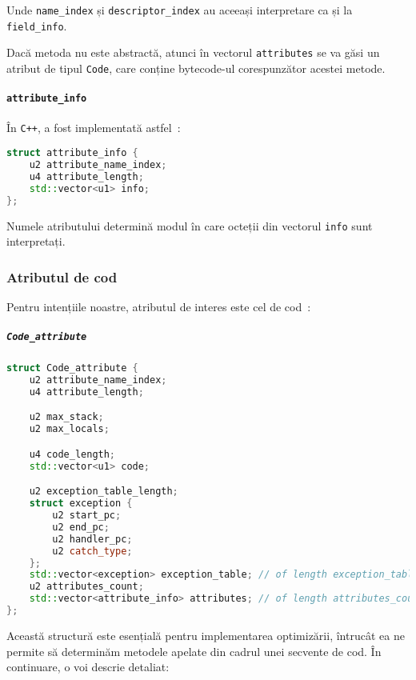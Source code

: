 Unde \texttt{name\_index} și \texttt{descriptor\_index} au aceeași
interpretare ca și la \texttt{field\_info}.

Dacă metoda nu este abstractă, atunci în vectorul \texttt{attributes} se
va găsi un atribut de tipul \texttt{Code}, care conține bytecode-ul
corespunzător acestei metode.

\paragraph{\texorpdfstring{\texttt{attribute\_info}}{attribute\_info}}\label{attribute_info}

În \texttt{C++}, a fost implementată astfel~\cite{classfile_sections}:

\begin{lstlisting}[language=C++]
struct attribute_info {
    u2 attribute_name_index;
    u4 attribute_length;
    std::vector<u1> info;
};
\end{lstlisting}

Numele atributului determină modul în care octeții din vectorul
\texttt{info} sunt interpretați.

\subsubsection{Atributul de cod}

Pentru intențiile noastre, atributul de interes este cel de cod~\cite{classfile_sections}:

\subparagraph{\texorpdfstring{\texttt{Code\_attribute}}{Code\_attribute}}\label{code_attribute}

\begin{lstlisting}[language=C++]
struct Code_attribute {
    u2 attribute_name_index;
    u4 attribute_length;

    u2 max_stack;
    u2 max_locals;

    u4 code_length;
    std::vector<u1> code;

    u2 exception_table_length;
    struct exception {
        u2 start_pc;
        u2 end_pc;
        u2 handler_pc;
        u2 catch_type;
    };
    std::vector<exception> exception_table; // of length exception_table_length.
    u2 attributes_count;
    std::vector<attribute_info> attributes; // of length attributes_count.
};
\end{lstlisting}

Această structură este esențială pentru implementarea optimizării,
întrucât ea ne permite să determinăm metodele apelate din cadrul unei secvente de cod.
În continuare, o voi descrie detaliat:

